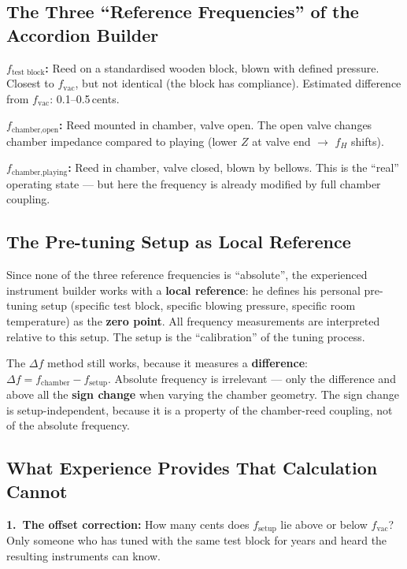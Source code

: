 \documentclass[11pt,a4paper]{article}
\begin{document}
\subsection{The Three ``Reference Frequencies'' of the Accordion Builder}

\textbf{$f_\text{test block}$:} Reed on a standardised wooden block, blown with defined pressure. Closest to $f_\text{vac}$, but not identical (the block has compliance). Estimated difference from $f_\text{vac}$: 0.1--0.5\,cents.

\textbf{$f_\text{chamber,open}$:} Reed mounted in chamber, valve open. The open valve changes chamber impedance compared to playing (lower $Z$ at valve end $\to$ $f_H$ shifts).

\textbf{$f_\text{chamber,playing}$:} Reed in chamber, valve closed, blown by bellows. This is the ``real'' operating state --- but here the frequency is already modified by full chamber coupling.

\subsection{The Pre-tuning Setup as Local Reference}

Since none of the three reference frequencies is ``absolute'', the experienced instrument builder works with a \textbf{local reference}: he defines his personal pre-tuning setup (specific test block, specific blowing pressure, specific room temperature) as the \textbf{zero point}. All frequency measurements are interpreted relative to this setup. The setup is the ``calibration'' of the tuning process.

The $\Delta f$ method still works, because it measures a \textbf{difference}: $\Delta f = f_\text{chamber} - f_\text{setup}$. Absolute frequency is irrelevant --- only the difference and above all the \textbf{sign change} when varying the chamber geometry. The sign change is setup-independent, because it is a property of the chamber-reed coupling, not of the absolute frequency.

\subsection{What Experience Provides That Calculation Cannot}

\textbf{1.\ The offset correction:} How many cents does $f_\text{setup}$ lie above or below $f_\text{vac}$? Only someone who has tuned with the same test block for years and heard the resulting instruments can know.
\end{document}
